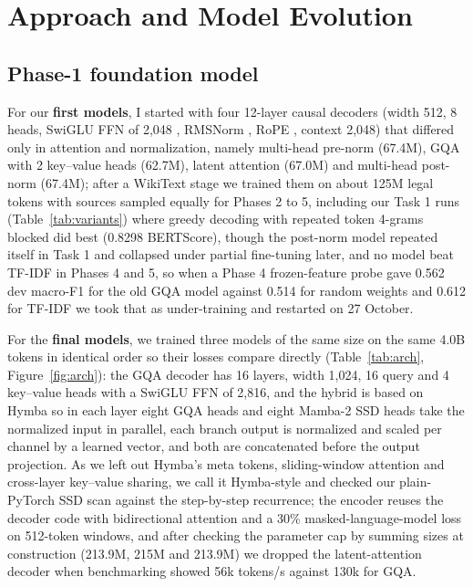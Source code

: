 \documentclass[11pt, oneside]{article}
\begin{document}
\section{Approach and Model Evolution}
\subsection{Phase-1 foundation model}
For our \textbf{first models}, I started with four 12-layer causal decoders (width 512, 8 heads, SwiGLU FFN of 2,048 \cite{shazeer2020glu}, RMSNorm \cite{zhang2019rmsnorm}, RoPE \cite{su2024roformer}, context 2,048) that differed only in attention and normalization, namely multi-head pre-norm (67.4M), GQA with 2 key--value heads \cite{ainslie2023gqa} (62.7M), latent attention \cite{deepseek2024v2} (67.0M) and multi-head post-norm (67.4M); after a WikiText stage we trained them on about 125M legal tokens with sources sampled equally for Phases 2 to 5, including our Task 1 runs (Table~\ref{tab:variants}) where greedy decoding with repeated token 4-grams blocked did best (0.8298 BERTScore), though the post-norm model repeated itself in Task 1 and collapsed under partial fine-tuning later, and no model beat TF-IDF in Phases 4 and 5, so when a Phase 4 frozen-feature probe gave 0.562 dev macro-F1 for the old GQA model against 0.514 for random weights and 0.612 for TF-IDF we took that as under-training and restarted on 27 October.

For the \textbf{final models}, we trained three models of the same size on the same 4.0B tokens in identical order so their losses compare directly (Table~\ref{tab:arch}, Figure~\ref{fig:arch}): the GQA decoder has 16 layers, width 1,024, 16 query and 4 key--value heads with a SwiGLU FFN of 2,816, and the hybrid is based on Hymba \cite{dong2024hymba} so in each layer eight GQA heads and eight Mamba-2 SSD heads \cite{dao2024mamba2} take the normalized input in parallel, each branch output is normalized and scaled per channel by a learned vector, and both are concatenated before the output projection. As we left out Hymba's meta tokens, sliding-window attention and cross-layer key--value sharing, we call it Hymba-style and checked our plain-PyTorch SSD scan against the step-by-step recurrence; the encoder reuses the decoder code with bidirectional attention and a 30\% masked-language-model loss \cite{devlin2019bert} on 512-token windows, and after checking the parameter cap by summing sizes at construction (213.9M, 215M and 213.9M) we dropped the latent-attention decoder when benchmarking showed 56k tokens/s against 130k for GQA.
\end{document}
